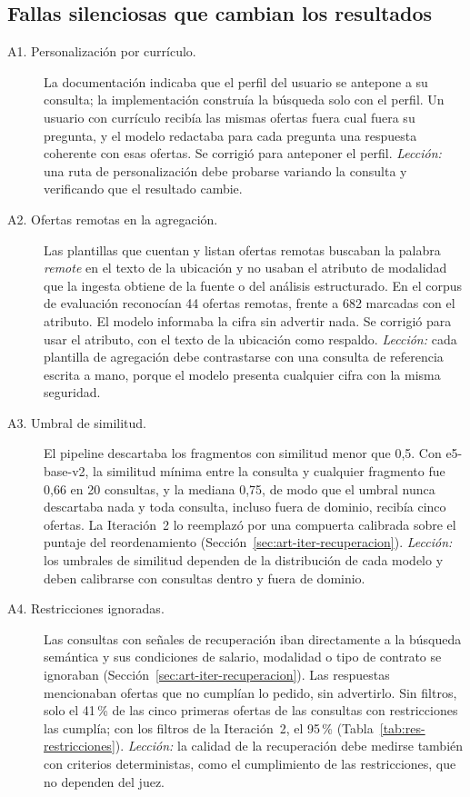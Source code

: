 \subsection{Fallas silenciosas que cambian los resultados}

\begin{description}
    \item[A1. Personalización por currículo.] La documentación indicaba que el perfil del usuario se antepone a su consulta; la implementación construía la búsqueda solo con el perfil. Un usuario con currículo recibía las mismas ofertas fuera cual fuera su pregunta, y el modelo redactaba para cada pregunta una respuesta coherente con esas ofertas. Se corrigió para anteponer el perfil. \emph{Lección:} una ruta de personalización debe probarse variando la consulta y verificando que el resultado cambie.
    \item[A2. Ofertas remotas en la agregación.] Las plantillas que cuentan y listan ofertas remotas buscaban la palabra \textit{remote} en el texto de la ubicación y no usaban el atributo de modalidad que la ingesta obtiene de la fuente o del análisis estructurado. En el corpus de evaluación reconocían 44 ofertas remotas, frente a 682 marcadas con el atributo. El modelo informaba la cifra sin advertir nada. Se corrigió para usar el atributo, con el texto de la ubicación como respaldo. \emph{Lección:} cada plantilla de agregación debe contrastarse con una consulta de referencia escrita a mano, porque el modelo presenta cualquier cifra con la misma seguridad.
    \item[A3. Umbral de similitud.] El pipeline descartaba los fragmentos con similitud menor que 0,5. Con e5-base-v2, la similitud mínima entre la consulta y cualquier fragmento fue 0,66 en 20 consultas, y la mediana 0,75, de modo que el umbral nunca descartaba nada y toda consulta, incluso fuera de dominio, recibía cinco ofertas. La Iteración~2 lo reemplazó por una compuerta calibrada sobre el puntaje del reordenamiento (Sección~\ref{sec:art-iter-recuperacion}). \emph{Lección:} los umbrales de similitud dependen de la distribución de cada modelo y deben calibrarse con consultas dentro y fuera de dominio.
    \item[A4. Restricciones ignoradas.] Las consultas con señales de recuperación iban directamente a la búsqueda semántica y sus condiciones de salario, modalidad o tipo de contrato se ignoraban (Sección~\ref{sec:art-iter-recuperacion}). Las respuestas mencionaban ofertas que no cumplían lo pedido, sin advertirlo. Sin filtros, solo el 41\,\% de las cinco primeras ofertas de las consultas con restricciones las cumplía; con los filtros de la Iteración~2, el 95\,\% (Tabla~\ref{tab:res-restricciones}). \emph{Lección:} la calidad de la recuperación debe medirse también con criterios deterministas, como el cumplimiento de las restricciones, que no dependen del juez.

\end{description}
